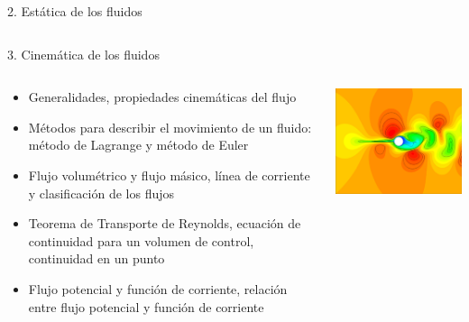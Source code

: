 \documentclass [xcolor=svgnames, t] {beamer}
\begin{document}
\begin{frame}{2. Est\'atica de los fluidos}
\begin{columns}
\begin{center}
\end{center}
\end{columns}
\end{frame}

\begin{frame}{3. Cinem\'atica de los fluidos}
\vspace{-0.9cm}
\begin{columns}
\begin{exampleblock}{}
\begin{itemize}
\item Generalidades, propiedades cinemáticas del flujo
\item Métodos para describir el movimiento de un fluido: método de Lagrange y método de Euler
\item Flujo volumétrico y flujo másico, línea de corriente y clasificación de los flujos
\item Teorema de Transporte de Reynolds, ecuación de continuidad para un volumen de control, continuidad en un punto
\item Flujo potencial y función de corriente, relación entre flujo potencial y función de corriente
\end{itemize}
\end{exampleblock}
\begin{center}
\includegraphics[width=\textwidth]{fmk}
\end{center}
\end{columns}
\end{frame}
\end{document}
